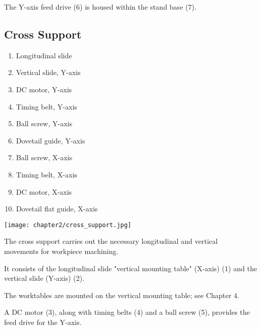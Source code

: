 \noindent The Y-axis feed drive (6) is housed within the stand base (7).

\vfill
\clearpage

\subsection{Cross Support}

\begin{minipage}{0.5\textwidth}
    \begin{enumerate}[itemsep=1pt,parsep=0pt]
        \item Longitudinal slide
        \item Vertical slide, Y-axis
        \item DC motor, Y-axis
        \item Timing belt, Y-axis
        \item Ball screw, Y-axis
        \item Dovetail guide, Y-axis
        \item Ball screw, X-axis
        \item Timing belt, X-axis
        \item DC motor, X-axis
        \item Dovetail flat guide, X-axis
    \end{enumerate}
\end{minipage}%
\begin{minipage}{0.5\textwidth}
    \centering
    \texttt{[image: chapter2/cross\_support.jpg]}
    \label{fig:cross_support}
\end{minipage}

\vspace{1cm}

\noindent The cross support carries out the necessary longitudinal and vertical\\ movements for workpiece machining.

\vspace{.3cm}

\noindent It consists of the longitudinal slide "vertical mounting table" (X-axis) (1) and the vertical slide (Y-axis) (2).

\vspace{.3cm}

\noindent The worktables are mounted on the vertical mounting table; see Chapter 4.

\vspace{.3cm}

\noindent A DC motor (3), along with timing belts (4) and a ball screw (5), provides the feed drive for the Y-axis.

